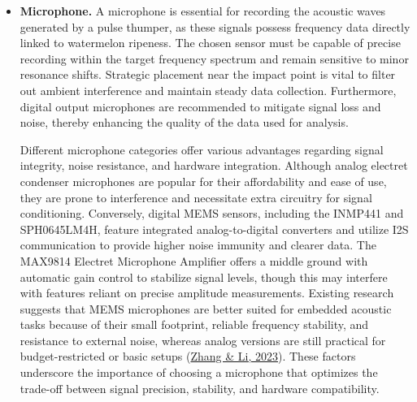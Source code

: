 \begin{thesisprose}
\begin{itemize}

\item \textbf{Microphone.} A microphone is essential for recording the acoustic waves generated by a pulse thumper, as these signals possess frequency data directly linked to watermelon ripeness. The chosen sensor must be capable of precise recording within the target frequency spectrum and remain sensitive to minor resonance shifts. Strategic placement near the impact point is vital to filter out ambient interference and maintain steady data collection. Furthermore, digital output microphones are recommended to mitigate signal loss and noise, thereby enhancing the quality of the data used for analysis.

Different microphone categories offer various advantages regarding signal integrity, noise resistance, and hardware integration. Although analog electret condenser microphones are popular for their affordability and ease of use, they are prone to interference and necessitate extra circuitry for signal conditioning. Conversely, digital MEMS sensors, including the INMP441 and SPH0645LM4H, feature integrated analog-to-digital converters and utilize I2S communication to provide higher noise immunity and clearer data. The MAX9814 Electret Microphone Amplifier offers a middle ground with automatic gain control to stabilize signal levels, though this may interfere with features reliant on precise amplitude measurements. Existing research suggests that MEMS microphones are better suited for embedded acoustic tasks because of their small footprint, reliable frequency stability, and resistance to external noise, whereas analog versions are still practical for budget-restricted or basic setups (\hyperlink{cite.zhang2023}{Zhang \& Li, 2023}). These factors underscore the importance of choosing a microphone that optimizes the trade-off between signal precision, stability, and hardware compatibility.

\end{itemize}




\end{thesisprose}
